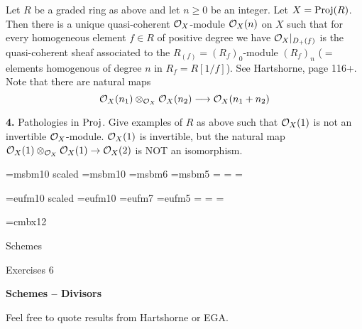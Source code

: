 \medskip{} Let $R$ be a graded ring as above and
let $n \geq 0$ be an integer. Let $X = \Proj(R)$. Then there is a unique
quasi-coherent ${\cal O}_X$-module ${\cal O}_X(n)$ on $X$ such that
for every homogeneous element $f \in R$ of positive degree we have
${\cal O}_X |_{D_{+}(f)}$ is the quasi-coherent sheaf associated to the
$R_{(f)} = (R_f)_0$-module $(R_f)_n$ ($=$elements homogenous of degree
$n$ in $R_f = R[1/f]$). See Hartshorne, page 116+. Note that there are
natural maps
$$
{\cal O}_X(n_1) \otimes_{{\cal O}_X} {\cal O}_X(n_2) \longrightarrow
{\cal O}_X(n_1+n_2)
$$

\medskip\item{\bf 4.} Pathologies in $\Proj$. 
Give examples of $R$ as above such that
 ${\cal O}_X(1)$ is not an invertible ${\cal O}_X$-module.
 ${\cal O}_X(1)$ is invertible, but the
natural map ${\cal O}_X(1) \otimes_{{\cal O}_X} {\cal O}_X(1) \to
{\cal O}_X(2)$ is NOT an isomorphism.

\bye
\nopagenumbers

\font\gbbb=msbm10 scaled 
\font\bbbf=msbm10 
\font\sbbb=msbm6 
\font\ssbbb=msbm5 
=\bbbf
{}=\sbbb 
{}=\ssbbb 
\def\bbb{\fam6}
\def\mP{{\bbb P}} 
\def\mA{{\bbb A}} 
\def\mB{{\bbb B}} 
\def\mR{{\bbb R}}
\def\mZ{{\bbb Z}}

\font\ggothic=eufm10 scaled 
\font\gothicf=eufm10
\font\sgothic=eufm7
\font\ssgothic=eufm5
=\gothicf
{}=\sgothic
{}=\ssgothic
\def\gothic{\fam5}


\font\Kopfont=cmbx12
\def\mapright#1{\smash{\mathop{\longrightarrow}\limits^{#1}}}
\def\mapdown#1{\Big\downarrow\rlap{$\vcenter{\hbox{$\scriptstyle#1$}}$}}
\def\downmap#1{\downarrow\rlap{$\vcenter{\hbox{$\scriptstyle#1$}}$}}
\def\mapup#1{\Big\uparrow\rlap{$\vcenter{\hbox{$\scriptstyle#1$}}$}}
\def\longlongrightarrow{\relbar \joinrel \longrightarrow}
\def\cC{{\cal C}}
\def\cD{{\cal D}}
\def\gp{{\gothic p}}
\def\gq{{\gothic q}}
\def\Spec{\mathop{\rm Spec}}
\def\Proj{\mathop{\rm Proj}}
\def\length{\mathop{\rm length}\nolimits}

\centerline{\Kopfont Schemes}

\smallskip
\centerline{Exercises 6}

\bigskip\noindent
{\bf Schemes -- Divisors}

\bigskip\noindent
Feel free to quote results from Hartshorne or EGA.

